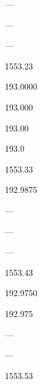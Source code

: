 \documentclass[letterpaper,10pt,english]{sphinxmanual}
\begin{document}
—





—





—





1553.23









193.0000





193.000





193.00





193.0





1553.33









192.9875





—





—





—





1553.43









192.9750





192.975





—





—





1553.53
\end{document}
